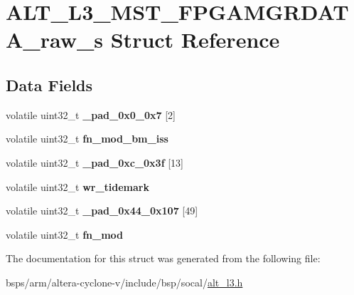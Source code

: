 \hypertarget{structALT__L3__MST__FPGAMGRDATA__raw__s}{}\section{A\+L\+T\+\_\+\+L3\+\_\+\+M\+S\+T\+\_\+\+F\+P\+G\+A\+M\+G\+R\+D\+A\+T\+A\+\_\+raw\+\_\+s Struct Reference}
\label{structALT__L3__MST__FPGAMGRDATA__raw__s}
\subsection*{Data Fields}
\begin{DoxyCompactItemize}
\item 
\mbox{\label{structALT__L3__MST__FPGAMGRDATA__raw__s_a32e3ef1ea04f25e8dfb616a8f507dd94}} 
volatile uint32\+\_\+t {\bfseries \+\_\+pad\+\_\+0x0\+\_\+0x7} \mbox{[}2\mbox{]}
\item 
\mbox{\label{structALT__L3__MST__FPGAMGRDATA__raw__s_afff4deba9f6ad22fddbf79221c740f38}} 
volatile uint32\+\_\+t {\bfseries fn\+\_\+mod\+\_\+bm\+\_\+iss}
\item 
\mbox{\label{structALT__L3__MST__FPGAMGRDATA__raw__s_adf08baca4475902c415544301bd0a3a9}} 
volatile uint32\+\_\+t {\bfseries \+\_\+pad\+\_\+0xc\+\_\+0x3f} \mbox{[}13\mbox{]}
\item 
\mbox{\label{structALT__L3__MST__FPGAMGRDATA__raw__s_a5cc1d41b22d83d7fb032a8b075245ad7}} 
volatile uint32\+\_\+t {\bfseries wr\+\_\+tidemark}
\item 
\mbox{\label{structALT__L3__MST__FPGAMGRDATA__raw__s_ac6f2b62cb322818c7536c21492ffde71}} 
volatile uint32\+\_\+t {\bfseries \+\_\+pad\+\_\+0x44\+\_\+0x107} \mbox{[}49\mbox{]}
\item 
\mbox{\label{structALT__L3__MST__FPGAMGRDATA__raw__s_adc09762f0aeb15df66fe6cf931fd244c}} 
volatile uint32\+\_\+t {\bfseries fn\+\_\+mod}
\end{DoxyCompactItemize}


The documentation for this struct was generated from the following file\+:\begin{DoxyCompactItemize}
\item 
bsps/arm/altera-\/cyclone-\/v/include/bsp/socal/\mbox{\hyperlink{alt__l3_8h}{alt\+\_\+l3.\+h}}\end{DoxyCompactItemize}
